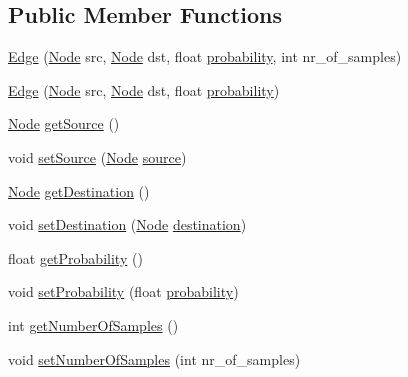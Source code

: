 \subsection*{Public Member Functions}
\begin{DoxyCompactItemize}
\item 
\hyperlink{classch_1_1zhaw_1_1ba10__bsha__1_1_1graph_1_1Edge_ac088e352be6ca6129cc4ebed08a95e29}{Edge} (\hyperlink{classch_1_1zhaw_1_1ba10__bsha__1_1_1graph_1_1Node}{Node} src, \hyperlink{classch_1_1zhaw_1_1ba10__bsha__1_1_1graph_1_1Node}{Node} dst, float \hyperlink{classch_1_1zhaw_1_1ba10__bsha__1_1_1graph_1_1Edge_ab718be8d9785b729e2f34a95e1560eb8}{probability}, int nr\_\-of\_\-samples)
\item 
\hyperlink{classch_1_1zhaw_1_1ba10__bsha__1_1_1graph_1_1Edge_a5c64d7964986451532b6d8d2f316847f}{Edge} (\hyperlink{classch_1_1zhaw_1_1ba10__bsha__1_1_1graph_1_1Node}{Node} src, \hyperlink{classch_1_1zhaw_1_1ba10__bsha__1_1_1graph_1_1Node}{Node} dst, float \hyperlink{classch_1_1zhaw_1_1ba10__bsha__1_1_1graph_1_1Edge_ab718be8d9785b729e2f34a95e1560eb8}{probability})
\item 
\hyperlink{classch_1_1zhaw_1_1ba10__bsha__1_1_1graph_1_1Node}{Node} \hyperlink{classch_1_1zhaw_1_1ba10__bsha__1_1_1graph_1_1Edge_a91ac8fa39b491040897bf69ce8427700}{getSource} ()
\item 
void \hyperlink{classch_1_1zhaw_1_1ba10__bsha__1_1_1graph_1_1Edge_a266fabf16c1d8d83f79a5e0cdb10a92e}{setSource} (\hyperlink{classch_1_1zhaw_1_1ba10__bsha__1_1_1graph_1_1Node}{Node} \hyperlink{classch_1_1zhaw_1_1ba10__bsha__1_1_1graph_1_1Edge_a3593144bcc6c3034968a8608f11191f7}{source})
\item 
\hyperlink{classch_1_1zhaw_1_1ba10__bsha__1_1_1graph_1_1Node}{Node} \hyperlink{classch_1_1zhaw_1_1ba10__bsha__1_1_1graph_1_1Edge_a6f3e5cd35728de7647168f1ba97e38df}{getDestination} ()
\item 
void \hyperlink{classch_1_1zhaw_1_1ba10__bsha__1_1_1graph_1_1Edge_a671037e83a841e6d651a688526d7722d}{setDestination} (\hyperlink{classch_1_1zhaw_1_1ba10__bsha__1_1_1graph_1_1Node}{Node} \hyperlink{classch_1_1zhaw_1_1ba10__bsha__1_1_1graph_1_1Edge_afa6d59aea26f9d343e7f7145fad87579}{destination})
\item 
float \hyperlink{classch_1_1zhaw_1_1ba10__bsha__1_1_1graph_1_1Edge_a7299d8da56c8e7774df3252c34ad631e}{getProbability} ()
\item 
void \hyperlink{classch_1_1zhaw_1_1ba10__bsha__1_1_1graph_1_1Edge_a17eec389fe6e7025ad328d888dd00f25}{setProbability} (float \hyperlink{classch_1_1zhaw_1_1ba10__bsha__1_1_1graph_1_1Edge_ab718be8d9785b729e2f34a95e1560eb8}{probability})
\item 
int \hyperlink{classch_1_1zhaw_1_1ba10__bsha__1_1_1graph_1_1Edge_aea10be56573d1755291dd0bd28256669}{getNumberOfSamples} ()
\item 
void \hyperlink{classch_1_1zhaw_1_1ba10__bsha__1_1_1graph_1_1Edge_aa288e1bc553af44b8d23f6c75b1267a8}{setNumberOfSamples} (int nr\_\-of\_\-samples)
\end{DoxyCompactItemize}
